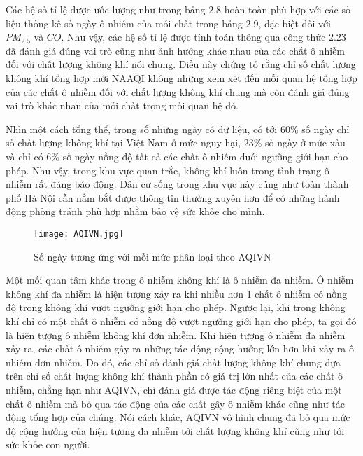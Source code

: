 \documentclass[14pt]{extreport}
\theoremstyle{definition}
\theoremstyle{plain}
\theoremstyle{remark}
\begin{document}
Các hệ số tỉ lệ được ước lượng như trong bảng 2.8 hoàn toàn phù hợp với các số liệu thống kê số ngày ô nhiễm của mỗi chất trong bảng 2.9, đặc biệt đối với $PM_{2.5}$ và $CO$. Như vậy, các hệ số tỉ lệ được tính toán thông qua công thức 2.23 đã đánh giá đúng vai trò cũng như ảnh hưởng khác nhau của các chất ô nhiễm đối với chất lượng không khí nói chung. Điều này chứng tỏ rằng chỉ số chất lượng không khí tổng hợp mới NAAQI không những xem xét đến mối quan hệ tổng hợp của các chất ô nhiễm đối với chất lượng không khí chung mà còn đánh giá đúng vai trò khác nhau của mỗi chất trong mối quan hệ đó.
    	
Nhìn một cách tổng thể, trong số những ngày có dữ liệu, có tới 60\% số ngày chỉ số chất lượng không khí tại Việt Nam ở mức nguy hại, 23\% số ngày ở mức xấu và chỉ có 6\% số ngày nồng độ tất cả các chất ô nhiễm dưới ngưỡng giới hạn cho phép. Như vậy, trong khu vực quan trắc, không khí luôn trong tình trạng ô nhiễm rất đáng báo động. Dân cư sống trong khu vực này cũng như toàn thành phố Hà Nội cần nắm bắt được thông tin thường xuyên hơn để có những hành động phòng tránh phù hợp nhằm bảo vệ sức khỏe cho mình.

\begin{figure}
\begin{center}
\texttt{[image: AQIVN.jpg]}
\end{center}
\caption{Số ngày tương ứng với mỗi mức phân loại theo AQIVN}
\end{figure}

Một mối quan tâm khác trong ô nhiễm không khí là ô nhiễm đa nhiễm. Ô nhiễm không khí đa nhiễm là hiện tượng xảy ra khi nhiều hơn 1 chất ô nhiễm có nồng độ trong không khí vượt ngưỡng giới hạn cho phép. Ngược lại, khi trong không khí chỉ có một chất ô nhiễm có nồng độ vượt ngưỡng giới hạn cho phép, ta gọi đó là hiện tượng ô nhiễm không khí đơn nhiễm. Khi hiện tượng ô nhiễm đa nhiễm xảy ra, các chất ô nhiễm gây ra những tác động cộng hưởng lớn hơn khi xảy ra ô nhiễm đơn nhiễm. Do đó, các chỉ số đánh giá chất lượng không khí chung dựa trên chỉ số chất lượng không khí thành phần có giá trị lớn nhất của các chất ô nhiễm, chẳng hạn như AQIVN, chỉ đánh giá được tác động riêng biệt của một chất ô nhiễm mà bỏ qua tác động của các chất gây ô nhiễm khác cũng như tác động tổng hợp của chúng. Nói cách khác, AQIVN vô hình chung đã bỏ qua mức độ cộng hưởng của hiện tượng đa nhiễm tới chất lượng không khí cũng như tới sức khỏe con người.
\end{document}
